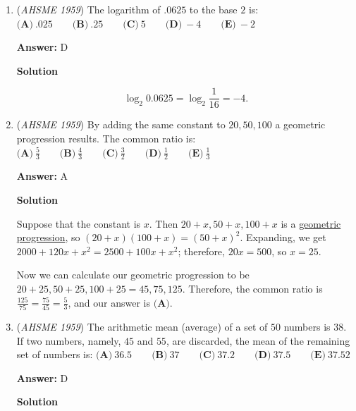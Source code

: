 \begin{enumerate}
 Note that $[\triangle ABC]=[\triangle ADE]$, so $\frac{1}{2}AB * AC *\sin\angle BAC = \frac{1}{2}AD * AE *\sin\angle DAE$. Since $\angle BAC = \angle DAE$, we have $AB*AC = AD*AE$, so that $3.6*3.6 = 1.2*AE$. Therefore, $AE = \frac{3.6^2}{1.2}=\boxed{\textbf{(D) }10.8}$.

 


	\item (\textit{AHSME 1959}) The logarithm of $.0625$ to the base $2$ is:
$\textbf{(A)}\ .025 \qquad\textbf{(B)}\ .25\qquad\textbf{(C)}\ 5\qquad\textbf{(D)}\ -4\qquad\textbf{(E)}\ -2$

 \textbf{Answer: }D



\textbf{Solution}


 \[\log_{2}{0.0625}=\log_{2}{\frac{1}{16}}=\boxed{-4}.\]



	\item (\textit{AHSME 1959}) By adding the same constant to $20,50,100$ a geometric progression results. The common ratio is:
$\textbf{(A)}\ \frac53 \qquad\textbf{(B)}\ \frac43\qquad\textbf{(C)}\ \frac32\qquad\textbf{(D)}\ \frac12\qquad\textbf{(E)}\ \frac{1}3$

 \textbf{Answer: }A



\textbf{Solution}

Suppose that the constant is $x$. Then $20+x, 50+x, 100+x$ is a \href{https://artofproblemsolving.com/wiki/index.php?title=Geometric\_progression}{geometric progression}, so $(20+x)(100+x) = (50+x)^2$. Expanding, we get $2000 + 120x + x^2 = 2500 + 100x + x^2$; therefore, $20x = 500$, so $x=25$.

 Now we can calculate our geometric progression to be $20+25, 50+25, 100+25 = 45, 75, 125$. Therefore, the common ratio is $\frac{125}{75} = \frac{75}{45} = \boxed{\frac{5}{3}}$, and our answer is $\boxed{\textbf{(A)}}$.

 


	\item (\textit{AHSME 1959}) The arithmetic mean (average) of a set of $50$ numbers is $38$. If two numbers, namely, $45$ and $55$, are discarded, the mean of the remaining set of numbers is:
$\textbf{(A)}\ 36.5 \qquad\textbf{(B)}\ 37\qquad\textbf{(C)}\ 37.2\qquad\textbf{(D)}\ 37.5\qquad\textbf{(E)}\ 37.52$

 \textbf{Answer: }D



\textbf{Solution}


\end{enumerate}
